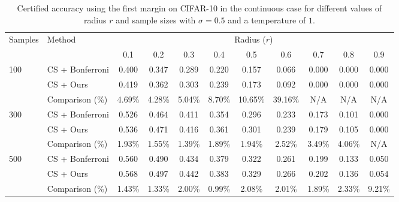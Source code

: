 \begin{table}[htbp]
    \centering
    \caption{Certified accuracy using the first margin on CIFAR-10 in the continuous case for different values of radius $r$ and sample sizes with $\sigma = 0.5$ and a temperature of $1$.}
    \label{tab:certified-accuracy}
    \renewcommand{\arraystretch}{1.2}
    \begin{tabular}{@{}ll*{9}{c}@{}}
        \toprule
        \multirow{2}{*}{Samples} & \multirow{2}{*}{Method} & \multicolumn{9}{c}{Radius ($r$)} \\
        \cmidrule(l){3-11}
        & & 0.1 & 0.2 & 0.3 & 0.4 & 0.5 & 0.6 & 0.7 & 0.8 & 0.9 \\
        \midrule
        \multirow{3}{*}{100}
        & CS + Bonferroni & 0.400 & 0.347 & 0.289 & 0.220 & 0.157 & 0.066 & 0.000 & 0.000 & 0.000 \\
        & CS + Ours            & 0.419 & 0.362 & 0.303 & 0.239 & 0.173 & 0.092 & 0.000 & 0.000 & 0.000 \\
        & Comparison (\%) & 4.69\% & 4.28\% & 5.04\% & 8.70\% & 10.65\% & 39.16\% & N/A & N/A & N/A \\
        \midrule
        \multirow{3}{*}{300}
        & CS + Bonferroni & 0.526 & 0.464 & 0.411 & 0.354 & 0.296 & 0.233 & 0.173 & 0.101 & 0.000 \\
        & CS + Ours             & 0.536 & 0.471 & 0.416 & 0.361 & 0.301 & 0.239 & 0.179 & 0.105 & 0.000 \\
        & Comparison (\%) & 1.93\% & 1.55\% & 1.39\% & 1.89\% & 1.94\% & 2.52\% & 3.49\% & 4.06\% & N/A \\
        \midrule
        \multirow{3}{*}{500}
        & CS + Bonferroni & 0.560 & 0.490 & 0.434 & 0.379 & 0.322 & 0.261 & 0.199 & 0.133 & 0.050 \\
        & CS + Ours             & 0.568 & 0.497 & 0.442 & 0.383 & 0.329 & 0.266 & 0.202 & 0.136 & 0.054 \\
        & Comparison (\%) & 1.43\% & 1.33\% & 2.00\% & 0.99\% & 2.08\% & 2.01\% & 1.89\% & 2.33\% & 9.21\% \\
        \bottomrule
    \end{tabular}
\end{table}
